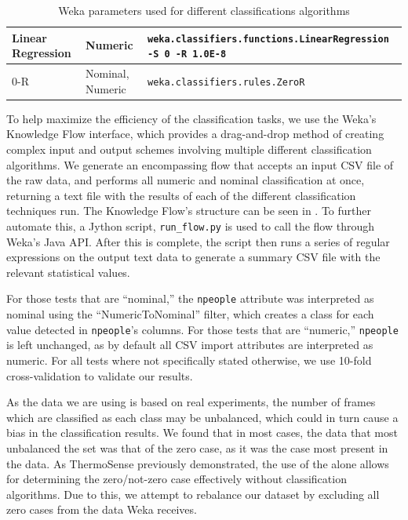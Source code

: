 \documentclass[../thesis/thesis.tex]{subfiles}
\begin{document}
\begin{table}
\begin{tabular}{|p{40mm}|p{20mm}|p{70mm}|}
Linear Regression & Numeric & \texttt{weka.classifiers.functions\newline.LinearRegression \newline -S 0 -R 1.0E-8} \\ \hline

0-R & Nominal, \newline Numeric & \texttt{weka.classifiers.rules.ZeroR} \\ \hline
\end{tabular}
\caption{Weka parameters used for different classifications algorithms}
\label{tab:methods:params}
\end{table}

To help maximize the efficiency of the classification tasks, we use the Weka's Knowledge Flow interface, which provides a drag-and-drop method of creating complex input and output schemes involving multiple different classification algorithms. We generate an encompassing flow that accepts an input CSV file of the raw data, and performs all numeric and nominal classification at once, returning a text file with the results of each of the different classification techniques run. The Knowledge Flow's structure can be seen in . To further automate this, a Jython script, \texttt{run\_flow.py} is used to call the flow through Weka's Java API. After this is complete, the script then runs a series of regular expressions on the output text data to generate a summary CSV file with the relevant statistical values.

For those tests that are ``nominal,'' the \texttt{npeople} attribute was interpreted as nominal using the ``NumericToNominal'' filter, which creates a class for each value detected in \texttt{npeople}'s columns. For those tests that are ``numeric,'' \texttt{npeople} is left unchanged, as by default all CSV import attributes are interpreted as numeric. For all tests where not specifically stated otherwise, we use 10-fold cross-validation to validate our results.

As the data we are using is based on real experiments, the number of frames which are classified as each class may be unbalanced, which could in turn cause a bias in the classification results. We found that in most cases, the data that most unbalanced the set was that of the zero case, as it was the case most present in the data. As ThermoSense previously demonstrated, the use of the \pir alone allows for determining the zero/not-zero case effectively without classification algorithms. Due to this, we attempt to rebalance our dataset by excluding all zero cases from the data Weka receives.
\end{document}
